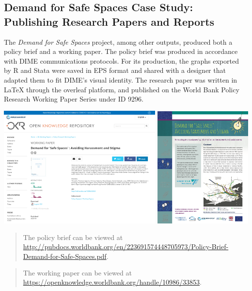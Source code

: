 \documentclass[
]{book}
\begin{document}
\begin{ex}
\hypertarget{demand-for-safe-spaces-case-study-publishing-research-papers-and-reports}{%
\subsection{Demand for Safe Spaces Case Study: Publishing Research Papers and Reports}\label{demand-for-safe-spaces-case-study-publishing-research-papers-and-reports}}

The \emph{Demand for Safe Spaces} project, among other outputs, produced both a policy brief and a working paper. The policy brief was produced in accordance with DIME communications protocols. For its production, the graphs exported by R and Stata were saved in EPS format and shared with a designer that adapted them to fit DIME's visual identity. The research paper was written in LaTeX through the overleaf platform, and published on the World Bank Policy Research Working Paper Series under ID 9296.

\includegraphics[width=0.62\textwidth,height=\textheight]{examples/WPS.png}
\includegraphics[width=0.37\textwidth,height=\textheight]{examples/brief.png}

\begin{quote}
The policy brief can be viewed at \url{http://pubdocs.worldbank.org/en/223691574448705973/Policy-Brief-Demand-for-Safe-Spaces.pdf}.
\end{quote}

\begin{quote}
The working paper can be viewed at \url{https://openknowledge.worldbank.org/handle/10986/33853}.
\end{quote}
\end{ex}
\end{document}
